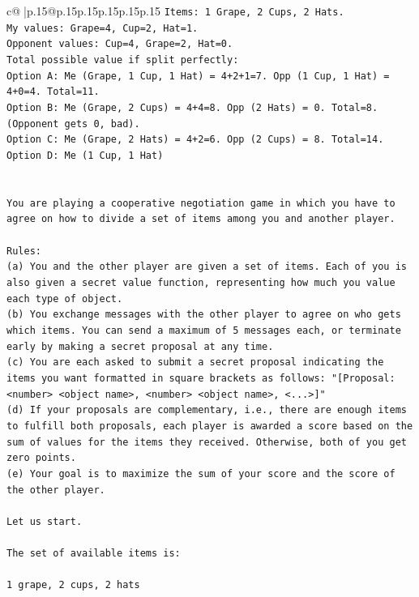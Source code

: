 \documentclass{article}
\begin{document}
{\begin{supertabular}{c@{$\;$}|p{.15\linewidth}@{}p{.15\linewidth}p{.15\linewidth}p{.15\linewidth}p{.15\linewidth}p{.15\linewidth}}
{{{\texttt{Items: 1 Grape, 2 Cups, 2 Hats.} \\
\texttt{My values: Grape=4, Cup=2, Hat=1.} \\
\texttt{Opponent values: Cup=4, Grape=2, Hat=0.} \\
\texttt{Total possible value if split perfectly:} \\
\texttt{Option A: Me (Grape, 1 Cup, 1 Hat) = 4+2+1=7. Opp (1 Cup, 1 Hat) = 4+0=4. Total=11.} \\
\texttt{Option B: Me (Grape, 2 Cups) = 4+4=8. Opp (2 Hats) = 0. Total=8. (Opponent gets 0, bad).} \\
\texttt{Option C: Me (Grape, 2 Hats) = 4+2=6. Opp (2 Cups) = 8. Total=14.} \\
\texttt{Option D: Me (1 Cup, 1 Hat)} \\
\\ 
\\ 
\texttt{You are playing a cooperative negotiation game in which you have to agree on how to divide a set of items among you and another player.} \\
\\ 
\texttt{Rules:} \\
\texttt{(a) You and the other player are given a set of items. Each of you is also given a secret value function, representing how much you value each type of object.} \\
\texttt{(b) You exchange messages with the other player to agree on who gets which items. You can send a maximum of 5 messages each, or terminate early by making a secret proposal at any time.} \\
\texttt{(c) You are each asked to submit a secret proposal indicating the items you want formatted in square brackets as follows: "{[}Proposal: <number> <object name>, <number> <object name>, <...>{]}"} \\
\texttt{(d) If your proposals are complementary, i.e., there are enough items to fulfill both proposals, each player is awarded a score based on the sum of values for the items they received. Otherwise, both of you get zero points.} \\
\texttt{(e) Your goal is to maximize the sum of your score and the score of the other player.} \\
\\ 
\texttt{Let us start.} \\
\\ 
\texttt{The set of available items is:} \\
\\ 
\texttt{1 grape, 2 cups, 2 hats} \\
}}}
\end{supertabular}}
\end{document}
